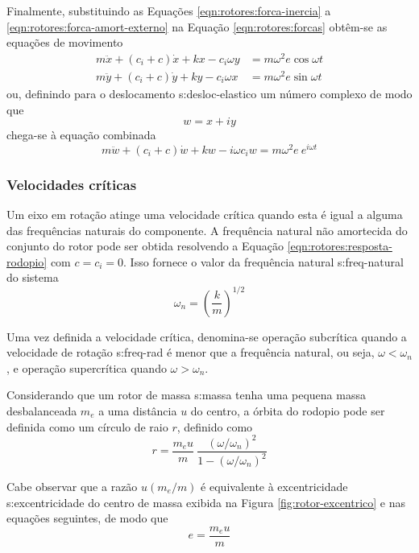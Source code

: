 \documentclass[12pt,oneside,english,brazil]{ucsmono}
\begin{document}
	Finalmente, substituindo as Equações \ref{eqn:rotores:forca-inercia} a \ref{eqn:rotores:forca-amort-externo} na Equação \ref{eqn:rotores:forcas} obtêm-se as equações de movimento \cite{rao:2008}
	\begin{align}
		m\ddot{x} + (c_i + c)\dot{x} + kx - c_i\omega y &= m\omega^2\mathit{e}\cos\omega t \\
		m\ddot{y} + (c_i + c)\dot{y} + ky - c_i\omega x &= m\omega^2\mathit{e}\sin\omega t
	\end{align}
	ou, definindo para o deslocamento \gls{s:desloc-elastico} um número complexo de modo que \[ w = x + iy \] chega-se à equação combinada
	\begin{equation}\label{eqn:rotores:resposta-rodopio}
		m\ddot{w} + (c_i + c)\dot{w} + kw - i\omega c_i w = m\omega^2 \mathit{e}\ e^{i\omega t}
	\end{equation}
	
	\subsubsection{Velocidades críticas}
	Um eixo em rotação atinge uma velocidade crítica quando esta é igual a alguma das frequências naturais do componente. A frequência natural não amortecida do conjunto do rotor pode ser obtida \cite{rao:2008} resolvendo a Equação \ref{eqn:rotores:resposta-rodopio} com $ c = c_i = 0 $. Isso fornece o valor da frequência natural \gls{s:freq-natural} do sistema
	\begin{equation} \label{eqn:freq-natural}
		\omega_n = \left( \frac{k}{m} \right)^{1/2}
	\end{equation}
	
	Uma vez definida a velocidade crítica, denomina-se \cite{dimarogonas:1995} operação subcrítica quando a velocidade de rotação \gls{s:freq-rad} é menor que a frequência natural, ou seja, $ \omega < \omega_n $, e operação supercrítica quando $ \omega > \omega_n $.
	
	Considerando que um rotor de massa \gls{s:massa} tenha uma pequena massa desbalanceada $ m_e $ a uma distância $ u $ do centro, a órbita do rodopio pode ser definida como um círculo de raio $ r $, definido como \cite{dimarogonas:1995}
	\begin{equation} \label{eqn:rotores:orbita-rodopio}
		r = \frac{m_e u}{m}\ \frac{(\omega/\omega_n)^2}{1 - (\omega/\omega_n)^2}
	\end{equation}
	
	Cabe observar que a razão $ u(m_e/m) $ é equivalente à excentricidade \gls{s:excentricidade} do centro de massa exibida na Figura \ref{fig:rotor-excentrico} e nas equações seguintes, de modo que
	\begin{equation}
		\mathit{e} = \frac{m_e u}{m}
	\end{equation}
	
\end{document}
